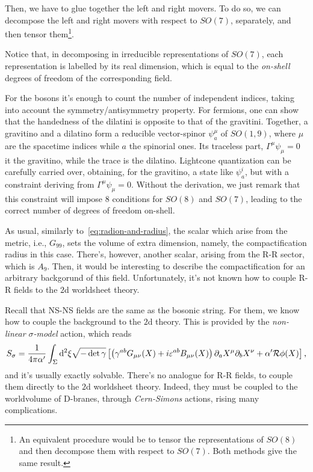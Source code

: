 Then, we have to glue together the left and right movers. To do so, we can decompose the left and right movers with respect to $SO(7)$, separately, and then tensor them\footnote{An equivalent procedure would be to tensor the representations of $SO(8)$ and then decompose them with respect to $SO(7)$. Both methods give the same result.}.
\begin{equation*}

\end{equation*}

Notice that, in decomposing in irreducible representations of $SO(7)$, each representation is labelled by its real dimension, which is equal to the \emph{on-shell} degrees of freedom of the corresponding field. 

For the bosons it's enough to count the number of independent indices, taking into account the symmetry/antisymmetry property. For fermions, one can show that the handedness of the dilatini is opposite to that of the gravitini. Together, a gravitino and a dilatino form a reducible vector-spinor $\psi^\mu_a$ of $SO(1,9)$, where $\mu$ are the spacetime indices while $a$ the spinorial ones. Its traceless part, $\Gamma^\mu \psi_\mu = 0$ it the gravitino, while the trace is the dilatino. Lightcone quantization can be carefully carried over, obtaining, for the gravitino, a state like $\psi^i_a$, but with a constraint deriving from $\Gamma^\mu \psi_\mu = 0$. Without the derivation, we just remark that this constraint will impose $8$ conditions for $SO(8)$ and $SO(7)$, leading to the correct number of degrees of freedom on-shell.

As usual, similarly to~\eqref{eq:radion-and-radius}, the scalar which arise from the metric, i.e., $G_{99}$, sets the volume of extra dimension, namely, the compactification radius in this case. There's, however, another scalar, arising from the R-R sector, which is $A_9$. Then, it would be interesting to describe the compactification for an arbitrary backgorund of this field. Unfortunately, it's not known how to couple R-R fields to the $2$d worldsheet theory.

Recall that NS-NS fields are the same as the bosonic string. For them, we know how to couple the background to the $2$d theory. This is provided by the \emph{non-linear $\sigma$-model} action, which reads
\begin{equation}
    S_\sigma = \frac{1}{4\pi\alpha'} \int_\Sigma \mathop{}\!\mathrm{d}^2 \xi \sqrt{-\det \gamma} \left[ \left( \gamma^{ab} G_{\mu\nu}(X) + i \varepsilon^{ab} B_{\mu\nu}(X)  \right) \partial_a X^\mu \partial_b X^\nu + \alpha' \mathcal{R} \phi(X) \right],
\end{equation}
and it's usually exactly solvable. There's no analogue for R-R fields, to couple them directly to the $2$d worldsheet theory. Indeed, they must be coupled to the worldvolume of D-branes, through \emph{Cern-Simons} actions, rising many complications.

